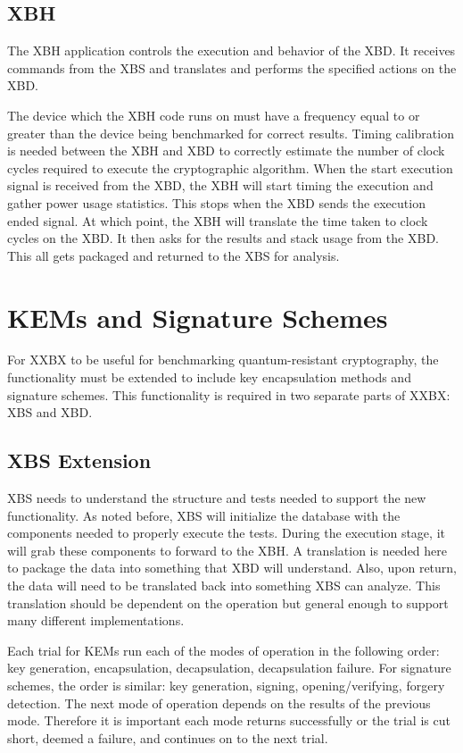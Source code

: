 \documentclass[10pt]{article}
\begin{document}
\subsection{XBH}
The XBH application controls the execution and behavior of the XBD. It receives commands 
from the XBS and translates and performs the specified actions on the XBD.

The device which the XBH code runs on must have a frequency equal to or greater than the 
device being benchmarked for correct results. Timing calibration is needed between the XBH 
and XBD to correctly estimate the number of clock cycles required to execute the cryptographic 
algorithm. When the start execution signal is received from the XBD, the XBH will start timing 
the execution and gather power usage statistics. This stops when the XBD sends the 
execution ended signal. At which point, the XBH will translate the time taken to clock cycles 
on the XBD. It then asks for the results and stack usage from the XBD.
This all gets packaged and returned to the XBS for analysis.

\section{KEMs and Signature Schemes}

For XXBX to be useful for benchmarking quantum-resistant cryptography, the functionality 
must be extended to include key encapsulation methods and signature schemes. This 
functionality is required in two separate parts of XXBX: XBS and XBD.

\subsection{XBS Extension}
XBS needs to understand the structure and tests needed to support the new functionality. 
As noted before, XBS will initialize the database with the components needed to properly 
execute the tests. During the execution stage, it will grab these components to forward 
to the XBH. A translation is needed here to package the data into something that XBD will 
understand. Also, upon return, the data will need to be translated back into something XBS 
can analyze. This translation should be dependent on the operation but general enough to 
support many different implementations.

Each trial for KEMs run each of the modes of operation in the following order: key generation, 
encapsulation, decapsulation, decapsulation failure. For signature schemes, the order is 
similar: key generation, signing, opening/verifying, forgery detection. The next mode of 
operation depends on the results of the previous mode. Therefore it is important each mode 
returns successfully or the trial is cut short, deemed a failure, and continues on to the 
next trial.
\end{document}
